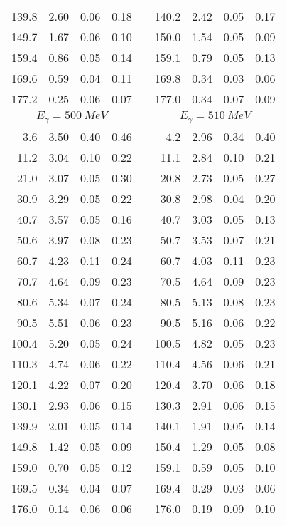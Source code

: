 \begin{table}[htbp]
\begin{center}
\begin{tabular}{|r|r|c|c|l|r|r|c|c|}
139.8 &  2.60 &  0.06 &  0.18 & & 140.2 &  2.42 &  0.05 &  0.17 \\ 
149.7 &  1.67 &  0.06 &  0.10 & & 150.0 &  1.54 &  0.05 &  0.09 \\ 
159.4 &  0.86 &  0.05 &  0.14 & & 159.1 &  0.79 &  0.05 &  0.13 \\ 
169.6 &  0.59 &  0.04 &  0.11 & & 169.8 &  0.34 &  0.03 &  0.06 \\ 
177.2 &  0.25 &  0.06 &  0.07 & & 177.0 &  0.34 &  0.07 &  0.09 \\ 
\hline 
\hline 
\multicolumn{4}{|c|}{ $E_{\gamma}=500~MeV$} & & 
\multicolumn{4}{c|}{ $E_{\gamma}=510~MeV$} \\ 
\cline{1-4} 
\cline{6-9} 
  3.6 &  3.50 &  0.40 &  0.46 & &   4.2 &  2.96 &  0.34 &  0.40 \\ 
 11.2 &  3.04 &  0.10 &  0.22 & &  11.1 &  2.84 &  0.10 &  0.21 \\ 
 21.0 &  3.07 &  0.05 &  0.30 & &  20.8 &  2.73 &  0.05 &  0.27 \\ 
 30.9 &  3.29 &  0.05 &  0.22 & &  30.8 &  2.98 &  0.04 &  0.20 \\ 
 40.7 &  3.57 &  0.05 &  0.16 & &  40.7 &  3.03 &  0.05 &  0.13 \\ 
 50.6 &  3.97 &  0.08 &  0.23 & &  50.7 &  3.53 &  0.07 &  0.21 \\ 
 60.7 &  4.23 &  0.11 &  0.24 & &  60.7 &  4.03 &  0.11 &  0.23 \\ 
 70.7 &  4.64 &  0.09 &  0.23 & &  70.5 &  4.64 &  0.09 &  0.23 \\ 
 80.6 &  5.34 &  0.07 &  0.24 & &  80.5 &  5.13 &  0.08 &  0.23 \\ 
 90.5 &  5.51 &  0.06 &  0.23 & &  90.5 &  5.16 &  0.06 &  0.22 \\ 
100.4 &  5.20 &  0.05 &  0.24 & & 100.5 &  4.82 &  0.05 &  0.23 \\ 
110.3 &  4.74 &  0.06 &  0.22 & & 110.4 &  4.56 &  0.06 &  0.21 \\ 
120.1 &  4.22 &  0.07 &  0.20 & & 120.4 &  3.70 &  0.06 &  0.18 \\ 
130.1 &  2.93 &  0.06 &  0.15 & & 130.3 &  2.91 &  0.06 &  0.15 \\ 
139.9 &  2.01 &  0.05 &  0.14 & & 140.1 &  1.91 &  0.05 &  0.14 \\ 
149.8 &  1.42 &  0.05 &  0.09 & & 150.4 &  1.29 &  0.05 &  0.08 \\ 
159.0 &  0.70 &  0.05 &  0.12 & & 159.1 &  0.59 &  0.05 &  0.10 \\ 
169.5 &  0.34 &  0.04 &  0.07 & & 169.4 &  0.29 &  0.03 &  0.06 \\ 
176.0 &  0.14 &  0.06 &  0.06 & & 176.0 &  0.19 &  0.09 &  0.10 \\ 
\cline{1-4} 
\cline{6-9} 
\end{tabular} 

\end{center} 
\end{table}
